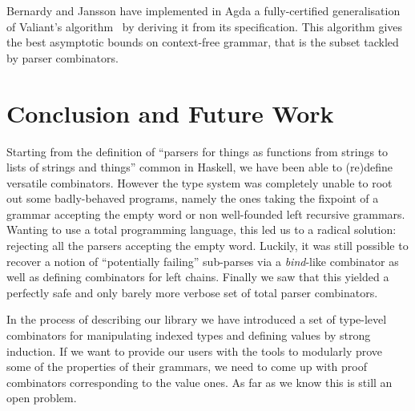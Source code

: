 Bernardy and Jansson have implemented in Agda a fully-certified generalisation
of Valiant's algorithm~\cite{bernardy2016certified} by deriving it from
its specification. This algorithm gives the best asymptotic bounds on
context-free grammar, that is the  subset tackled by
parser combinators.

\section{Conclusion and Future Work}

Starting from the definition of ``parsers for things as functions from
strings to lists of strings and things'' common in Haskell, we have been
able to (re)define versatile combinators. However the type system was
completely unable to root out some badly-behaved programs, namely the
ones taking the fixpoint of a grammar accepting the empty word or non
well-founded left recursive grammars. Wanting to use a total programming
language, this led us to a radical solution: rejecting all the parsers
accepting the empty word. Luckily, it was still possible to recover a
notion of ``potentially failing'' sub-parses via a \textit{bind}-like
combinator as well as defining combinators for left chains. Finally we
saw that this yielded a perfectly safe and only barely more verbose set
of total parser combinators.

In the process of describing our library we have introduced a set of
type-level combinators for manipulating indexed types and defining
values by strong induction. If we want to provide our users with the
tools to modularly prove some of the properties of their grammars, we
need to come up with proof combinators corresponding to the value ones.
As far as we know this is still an open problem.
